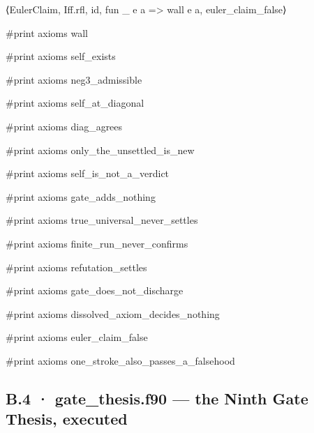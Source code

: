 \documentclass[10pt,twocolumn]{article}
\newenvironment{Shaded}{}{}
\newcommand{\NormalTok}[1]{#1}
\providecommand{\NormalTok}[1]{#1}
\providecommand{\NormalTok}[1]{#1}
\begin{document}
\begin{strip}
\begin{Shaded}
\begin{Highlighting}[]
\NormalTok{  ⟨EulerClaim, Iff.rfl, id, fun \_ e a =\textgreater{} wall e a, euler\_claim\_false⟩}

\NormalTok{\#print axioms wall}

\NormalTok{\#print axioms self\_exists}

\NormalTok{\#print axioms neg3\_admissible}

\NormalTok{\#print axioms self\_at\_diagonal}

\NormalTok{\#print axioms diag\_agrees}

\NormalTok{\#print axioms only\_the\_unsettled\_is\_new}

\NormalTok{\#print axioms self\_is\_not\_a\_verdict}

\NormalTok{\#print axioms gate\_adds\_nothing}

\NormalTok{\#print axioms true\_universal\_never\_settles}

\NormalTok{\#print axioms finite\_run\_never\_confirms}

\NormalTok{\#print axioms refutation\_settles}

\NormalTok{\#print axioms gate\_does\_not\_discharge}

\NormalTok{\#print axioms dissolved\_axiom\_decides\_nothing}

\NormalTok{\#print axioms euler\_claim\_false}

\NormalTok{\#print axioms one\_stroke\_also\_passes\_a\_falsehood}
\end{Highlighting}
\end{Shaded}
\end{strip}

\subsection{B.4 · gate\_thesis.f90 --- the Ninth Gate Thesis,
executed}\label{b.4-gate_thesis.f90-the-ninth-gate-thesis-executed}
\end{document}
